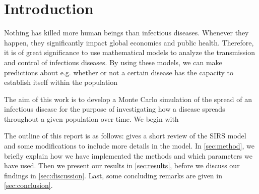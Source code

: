 \documentclass[../main.tex]{subfiles}
\begin{document}
\section{Introduction}\label{sec:introduction}

Nothing has killed more human beings than infectious diseases. Whenever they happen, they significantly impact global economies and public health. Therefore, it is of great significance to use mathematical models to analyze the transmission and control of infectious diseases. By using these models, we can make predictions about e.g. whether or not a certain disease has the capacity to establish itself within the population

The aim of this work is to develop a Monte Carlo simulation of the spread of an infectious disease for the purpose of investigating how a disease spreads throughout a given population over time. We begin with 

The outline of this report is as follows:  gives a short review of the SIRS model and some modifications to include more details in the model. In \cref{sec:method}, we briefly explain how we have implemented the methods and which parameters we have used. Then we present our results in \cref{sec:results}, before we discuss our findings in \cref{sec:discussion}. Last, some concluding remarks are given in \cref{sec:conclusion}.
\end{document}
